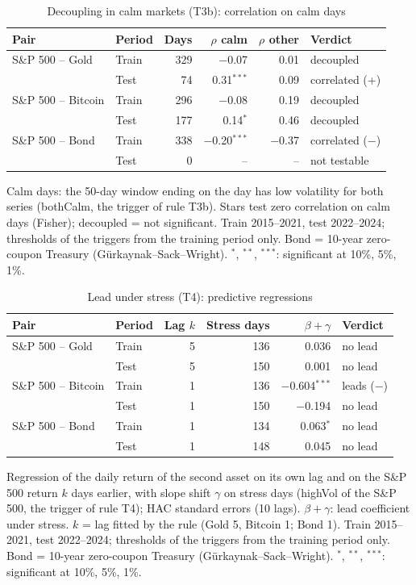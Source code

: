 \begin{table}[t]
\centering
\scriptsize
\setlength{\tabcolsep}{3.5pt}
\caption{Decoupling in calm markets (T3b): correlation on calm days}
\label{tab:econ_t3}
\begin{tabular}{llrrrl}
\toprule
Pair & Period & Days & $\rho$ calm & $\rho$ other & Verdict \\
\midrule
S\&P 500 -- Gold & Train & 329 & $-$0.07 & 0.01 & decoupled \\
 & Test & 74 & 0.31$^{***}$ & 0.09 & correlated (+) \\
S\&P 500 -- Bitcoin & Train & 296 & $-$0.08 & 0.19 & decoupled \\
 & Test & 177 & 0.14$^{*}$ & 0.46 & decoupled \\
S\&P 500 -- Bond & Train & 338 & $-$0.20$^{***}$ & $-$0.37 & correlated ($-$) \\
 & Test & 0 & -- & -- & not testable \\
\bottomrule
\end{tabular}
\par\smallskip
\parbox{\linewidth}{\footnotesize Calm days: the 50-day window ending on the day has low volatility for both series (bothCalm, the trigger of rule T3b). Stars test zero correlation on calm days (Fisher); decoupled = not significant. Train 2015--2021, test 2022--2024; thresholds of the triggers from the training period only. Bond = 10-year zero-coupon Treasury (G\"urkaynak--Sack--Wright). $^{*}$, $^{**}$, $^{***}$: significant at 10\%, 5\%, 1\%.}
\end{table}

\begin{table}[t]
\centering
\scriptsize
\setlength{\tabcolsep}{3.5pt}
\caption{Lead under stress (T4): predictive regressions}
\label{tab:econ_t4}
\begin{tabular}{llrrrl}
\toprule
Pair & Period & Lag $k$ & Stress days & $\beta+\gamma$ & Verdict \\
\midrule
S\&P 500 -- Gold & Train & 5 & 136 & 0.036 & no lead \\
 & Test & 5 & 150 & 0.001 & no lead \\
S\&P 500 -- Bitcoin & Train & 1 & 136 & $-$0.604$^{***}$ & leads ($-$) \\
 & Test & 1 & 150 & $-$0.194 & no lead \\
S\&P 500 -- Bond & Train & 1 & 134 & 0.063$^{*}$ & no lead \\
 & Test & 1 & 148 & 0.045 & no lead \\
\bottomrule
\end{tabular}
\par\smallskip
\parbox{\linewidth}{\footnotesize Regression of the daily return of the second asset on its own lag and on the S\&P 500 return $k$ days earlier, with slope shift $\gamma$ on stress days (highVol of the S\&P 500, the trigger of rule T4); HAC standard errors (10 lags). $\beta+\gamma$: lead coefficient under stress. $k$ = lag fitted by the rule (Gold 5, Bitcoin 1; Bond 1). Train 2015--2021, test 2022--2024; thresholds of the triggers from the training period only. Bond = 10-year zero-coupon Treasury (G\"urkaynak--Sack--Wright). $^{*}$, $^{**}$, $^{***}$: significant at 10\%, 5\%, 1\%.}
\end{table}

